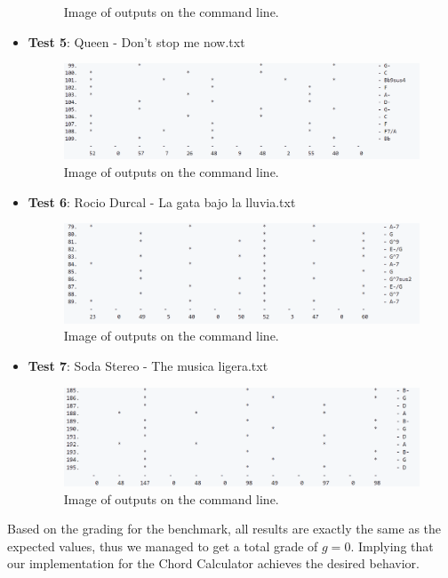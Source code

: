 \documentclass{article}
\begin{document}
\begin{itemize}
\begin{figure}[H]
        \caption{Image of outputs on the command line.}
    \end{figure}
    \item \textbf{Test 5}: Queen - Don't stop me now.txt
    \begin{figure}[H]
        \centering
        \includegraphics[width=1\textwidth]{Image_DontStopMeNow.png}
        \caption{Image of outputs on the command line.}
    \end{figure}
    \item \textbf{Test 6}: Rocio Durcal - La gata bajo la lluvia.txt
    \begin{figure}[H]
        \centering
        \includegraphics[width=1\textwidth]{Image_LaGataBajoLaLluvia.png}
        \caption{Image of outputs on the command line.}
    \end{figure}
    \item \textbf{Test 7}: Soda Stereo - The musica ligera.txt
    \begin{figure}[H]
        \centering
        \includegraphics[width=1\textwidth]{Image_DeMusicaLigeraParsed.png}
        \caption{Image of outputs on the command line.}
    \end{figure}
\end{itemize}
Based on the grading for the benchmark, all results are exactly the same as the expected values, thus we managed to get a total grade of $g = 0$. Implying that our implementation for the Chord Calculator achieves the desired behavior. 
\end{document}

